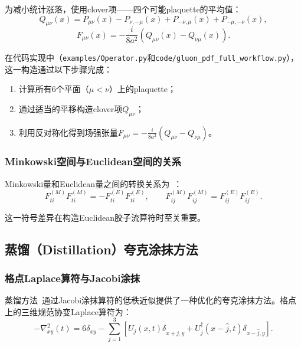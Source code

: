 \documentclass[12pt,a4paper]{ctexart}
\theoremstyle{definition}
\begin{document}
为减小统计涨落，使用clover项——四个可能plaquette的平均值：
\begin{equation}\label{eq:Qmunu}
    Q_{\mu\nu}(x) = P_{\mu\nu}(x) - P_{\nu,-\mu}(x) + P_{-\nu,\mu}(x) + P_{-\mu,-\nu}(x),
\end{equation}
\begin{equation}\label{eq:F_clover}
    F_{\mu\nu}(x) = -\frac{i}{8a^2} (Q_{\mu\nu}(x) - Q_{\nu\mu}(x)).
\end{equation}

在代码实现中（\texttt{examples/Operator.py}和\texttt{code/gluon\_pdf\_full\_workflow.py}），这一构造通过以下步骤完成：
\begin{enumerate}
    \item 计算所有6个平面（$\mu<\nu$）上的plaquette；
    \item 通过适当的平移构造clover项$Q_{\mu\nu}$；
    \item 利用反对称化得到场强张量$F_{\mu\nu} = -\frac{i}{8a^2}(Q_{\mu\nu} - Q_{\nu\mu})$。
\end{enumerate}

\subsubsection{Minkowski空间与Euclidean空间的关系}

Minkowski量和Euclidean量之间的转换关系为~\cite{Balitsky:2019krj}：
\begin{equation}\label{eq:ME_relation}
    F^{(M)}_{ti} F^{(M)}_{ti} = -F^{(E)}_{ti} F^{(E)}_{ti}, \qquad
    F^{(M)}_{ij} F^{(M)}_{ij} = F^{(E)}_{ij} F^{(E)}_{ij}.
\end{equation}

这一符号差异在构造Euclidean胶子流算符时至关重要。

\subsection{蒸馏（Distillation）夸克涂抹方法}

\subsubsection{格点Laplace算符与Jacobi涂抹}

蒸馏方法~\cite{Peardon:2009gh}通过Jacobi涂抹算符的低秩近似提供了一种优化的夸克涂抹方法。格点上的三维规范协变Laplace算符为：
\begin{equation}\label{eq:laplacian}
    -\nabla^2_{xy}(t) = 6\delta_{xy} - \sum_{j=1}^{3} \left[U_j(x,t)\delta_{x+\hat{j},y} + U^\dagger_j(x-\hat{j},t)\delta_{x-\hat{j},y}\right].
\end{equation}
\end{document}

